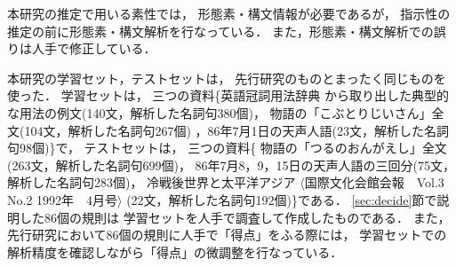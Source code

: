 本研究の推定で用いる素性では，
形態素・構文情報が必要であるが，
指示性の推定の前に形態素・構文解析を行なっている\cite{juman}\cite{csan2_ieice}．
また，形態素・構文解析での誤りは人手で修正している．

本研究の学習セット，テストセットは，
先行研究のものとまったく同じものを使った．
学習セットは，
三つの資料\{英語冠詞用法辞典\cite{kanshi}
から取り出した典型的な用法の例文(140文，解析した名詞句380個)，
物語の「こぶとりじいさん」\cite{kobu}全文(104文，解析した名詞句267個)
，86年7月1日の天声人語(23文，解析した名詞句98個)\}で，
テストセットは，
三つの資料\{
物語の「つるのおんがえし」\cite{kobu}全文(263文，解析した名詞句699個)，
86年7月8，9，15日の天声人語の三回分(75文，解析した名詞句283個)，
冷戦後世界と太平洋アジア
$\langle$国際文化会館会報　Vol.3  No.2  1992年　4月号$\rangle$
(22文，解析した名詞句192個)\}である．
\ref{sec:decide}節で説明した86個の規則は
学習セットを人手で調査して作成したものである．
また，先行研究において86個の規則に人手で「得点」をふる際には，
学習セットでの解析精度を確認しながら「得点」の微調整を行なっている．

